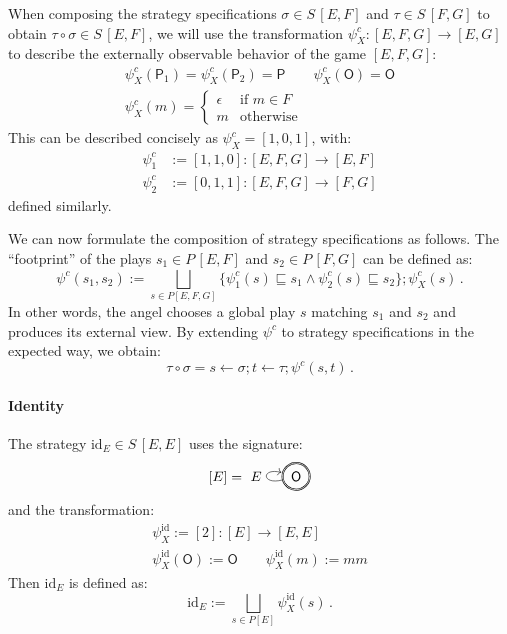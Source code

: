 \documentclass[sigplan,10pt,review,anonymous]{acmart}
\newcommand{\kw}[1]{\ensuremath{ \mathsf{#1} }}
\begin{document}
When composing the strategy specifications
$\sigma \in S \, [E, F]$ and
$\tau \in S \, [F, G]$
to obtain $\tau \circ \sigma \in S \, [E, F]$,
we will use the transformation
$\psi^c_X : [E,F,G] \rightarrow [E,G]$
to describe the externally observable behavior
of the game $[E,F,G]$:
\begin{gather*}
  \psi^c_X(\kw{P}_1) = \psi^c_X(\kw{P}_2) = \kw{P} \qquad
  \psi^c_X(\kw{O}) = \kw{O}
  \\
  \psi^c_X(m) = \begin{cases}
    \epsilon & \text{if } m \in F \\
    m & \text{otherwise}
  \end{cases}
\end{gather*}
This can be described concisely as
$\psi^c_X = [1,0,1]$,
with:
\begin{align*}
  \psi^c_1 &:= [1,1,0] :
    [E,F,G] \rightarrow [E,F] \\
  \psi^c_2 &:= [0,1,1] :
     [E,F,G] \rightarrow [F,G]
\end{align*}
defined similarly.

We can now formulate the composition of strategy specifications as follows.
The ``footprint'' of the plays $s_1 \in P \, [E,F]$ and $s_2 \in P \, [F,G]$
can be defined as:
\[
  \psi^c(s_1, s_2) :=
    \bigsqcup_{s \in P [E,F,G]}
    \{ \psi^c_1(s) \sqsubseteq s_1 \wedge \psi^c_2(s) \sqsubseteq s_2 \} ;
    \psi^c_X(s) \,.
\]
In other words,
the angel chooses a global play $s$
matching $s_1$ and $s_2$
and produces its external view.
By extending $\psi^c$ to strategy specifications
in the expected way, we obtain:
\[
  \tau \circ \sigma = 
    s \leftarrow \sigma ;
    t \leftarrow \tau ;
    \psi^c(s, t) \,.
\]


\paragraph{Identity} %

The strategy $\mathrm{id}_E \in S \, [E,E]$
uses the signature:
\[
  [E] =
  \begin{tikzpicture}[baseline=(O.base)]
    \node[circle,draw,double] (O) at (0,0) {$\kw{O}$};
    \path[->] (O) edge[loop left] node[auto] {$E$} (O);
  \end{tikzpicture}
\]
and the transformation:
\begin{gather*}
  \psi^\mathrm{id}_X := [2] : [E] \rightarrow [E,E] \\
  \psi^\mathrm{id}_X(\kw{O}) := \kw{O} \qquad
  \psi^\mathrm{id}_X(m) := mm
\end{gather*}
Then $\mathrm{id}_E$ is defined as:
\[
  \mathrm{id}_E :=
    \bigsqcup_{s \in P [E]} \psi^\mathrm{id}_X(s) \,.
\]
\end{document}
